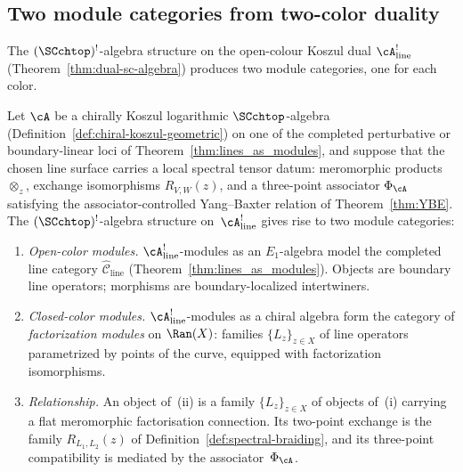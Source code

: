 \subsection{Two module categories from two-color duality}
\label{subsec:two-module-categories}

The $(\SCchtop)^{!}$-algebra structure on the open-colour Koszul dual
$\cA^!_{\mathrm{line}}$
\textup{(}Theorem~\textup{\ref{thm:dual-sc-algebra}}\textup{)}
produces two module
categories, one for each color.

\begin{theorem}
\label{thm:two-module-categories}
Let $\cA$ be a chirally Koszul logarithmic
$\SCchtop$-algebra
\textup{(}Definition~\textup{\ref{def:chiral-koszul-geometric})}
on one of the completed perturbative or boundary-linear loci of
Theorem~\ref{thm:lines_as_modules}, and suppose that the chosen
line surface carries a local spectral tensor datum: meromorphic
products $\otimes_z$, exchange isomorphisms $R_{V,W}(z)$, and a
three-point associator $\Phi_\cA$ satisfying the associator-controlled
Yang--Baxter relation of Theorem~\ref{thm:YBE}.
The $(\SCchtop)^{!}$-algebra structure
on~$\cA^!_{\mathrm{line}}$ gives rise to two module categories:
\begin{enumerate}[label=\textup{(\roman*)}]
\item \emph{Open-color modules.}
 $\cA^!_{\mathrm{line}}$-modules as an $E_1$-algebra model the
 completed line category $\widehat{\mathcal{C}}_{\mathrm{line}}$
 (Theorem~\ref{thm:lines_as_modules}). Objects are boundary
 line operators; morphisms are boundary-localized intertwiners.
\item \emph{Closed-color modules.}
 $\cA^!_{\mathrm{line}}$-modules as a chiral algebra form the category of
 \emph{factorization modules} on $\Ran(X)$: families
 $\{L_z\}_{z \in X}$ of line operators parametrized by
 points of the curve, equipped with factorization isomorphisms.
\item \emph{Relationship.}
 An object of~\textup{(ii)} is a family
 $\{L_z\}_{z \in X}$ of objects of~\textup{(i)} carrying a
 flat meromorphic factorisation connection. Its two-point exchange is
 the family $R_{L_1,L_2}(z)$ of
 Definition~\ref{def:spectral-braiding}, and its three-point
 compatibility is mediated by the associator~$\Phi_\cA$.
\end{enumerate}
\end{theorem}

